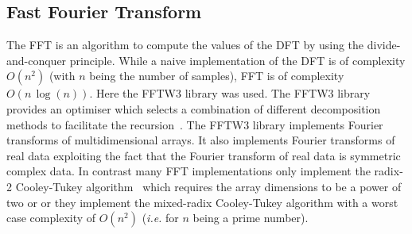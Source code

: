\documentclass[12pt,a4paper,oneside,openright]{book}
\newcommand{\ie}{\emph{i.e.} }
\begin{document}
\begin{CJK}{UTF8}{}
\subsection{Fast Fourier Transform}
The \ac{FFT} is an algorithm to compute the values of the \ac{DFT} by using the divide-and-conquer principle. While a naive implementation of the \ac{DFT} is of complexity $O(n^2)$ (with $n$ being the number of samples), \ac{FFT} is of complexity $O(n\,\operatorname{log}(n))$. Here the \ac{FFTW3} library was used. The \ac{FFTW3} library provides an optimiser which selects a combination of different decomposition methods to facilitate the recursion~\citep{RefWorks:378}. The \ac{FFTW3} library implements Fourier transforms of multidimensional arrays. It also implements Fourier transforms of real data exploiting the fact that the Fourier transform of real data is symmetric complex data. In contrast many \ac{FFT} implementations only implement the radix-2 Cooley-Tukey algorithm~\citep{cooley1965algorithm} which requires the array dimensions to be a power of two or or they implement the mixed-radix Cooley-Tukey algorithm with a worst case complexity of $O(n^2)$ (\ie for $n$ being a prime number).


\end{CJK}
\end{document}
